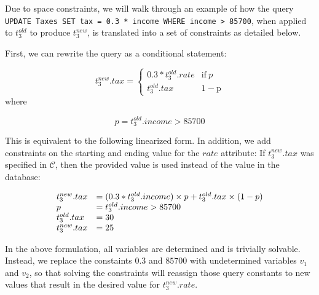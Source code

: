 
Due to space constraints, we will walk through an example of how the query
\texttt{UPDATE Taxes SET tax = 0.3 * income WHERE income > 85700}, when applied to 
$t_3^{old}$ to produce $t_3^{new}$, is translated into a set of constraints
as detailed below.

First, we can rewrite the query as a conditional statement:

\vspace*{-0.15in}
{\scriptsize
\[
t_3^{new}.tax = \begin{cases}
				  0.3*t_3^{old}.rate              & \mathrm{if}\ p  \\
                  t_3^{old}.tax  & \mathrm{1-p}
               \end{cases}
\]}
\vspace*{-0.1in}
where 
\vspace*{-0.1in}

{\scriptsize
\[p = t_3^{old}.income > 85700\]
}
\vspace*{-0.1in}

This is equivalent to the following linearized form.
In addition, we add constraints on the starting and ending value for the $rate$ attribute:
If $t_3^{new}.tax$ was specified in $\mathcal{C}$, then the provided value
is used instead of the value in the database:
\vspace*{-0.1in}

{\scriptsize
\[
\begin{array}{l l l}
t_3^{new}.tax &= (0.3*t_3^{old}.income)\times p + t_3^{old}.tax\times (1-p)\\
p &= t_3^{old}.income > 85700\\
t_3^{old}.tax &= 30 \\
t_3^{new}.tax &= 25
\end{array}
\]}

\vspace*{-0.1in}
In the above formulation, all variables are determined and is trivially
solvable.  Instead, we replace
the constaints $0.3$ and $85700$ with undetermined variables $v_1$ and $v_2$,
so that solving the constraints will reassign those query constants 
to new values that result in the desired value for $t_3^{new}.rate$.  
\iffalse
\[
\begin{array}{l l l}
t_3^{new}.tax &= (v_1*t_3^{old}.income)\times p + t_3^{old}.tax\times (1-p)\\
p              &= t_3^{old}.income > v_2\\
t_3^{old}.tax 30 \\
t_3^{new}.tax &= 25 \\
v_1            &\in [minval, maxval]\\
v_2            &\in [minval, maxval]\\
\end{array}
\]
\fi
